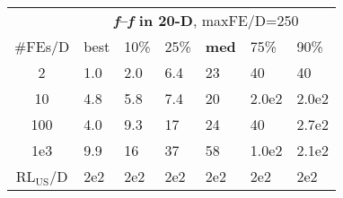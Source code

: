 \begin{tabular}{c|llllll}
 & \multicolumn{6}{|c}{\textbf{\textit{f}\raisebox{-0.35ex}{1}--\textit{f}\raisebox{-0.35ex}{24} in 20-D}, maxFE/D=250}\\
\#FEs/D & best & 10\% & 25\% & \textbf{med} & 75\% & 90\%\\
2 & \hspace*{1ex}1.0 & \hspace*{1ex}2.0 & \hspace*{1ex}6.4 & 23 & 40 & 40\\
10 & \hspace*{1ex}4.8 & \hspace*{1ex}5.8 & \hspace*{1ex}7.4 & 20 & 2.0e2 & 2.0e2\\
100 & \hspace*{1ex}4.0 & \hspace*{1ex}9.3 & 17 & 24 & 40 & 2.7e2\\
1e3 & \hspace*{1ex}9.9 & 16 & 37 & 58 & 1.0e2 & 2.1e2\\
$\text{RL}_{\text{US}}$/D & 2e2 & 2e2 & 2e2 & 2e2 & 2e2 & 2e2
\end{tabular}
